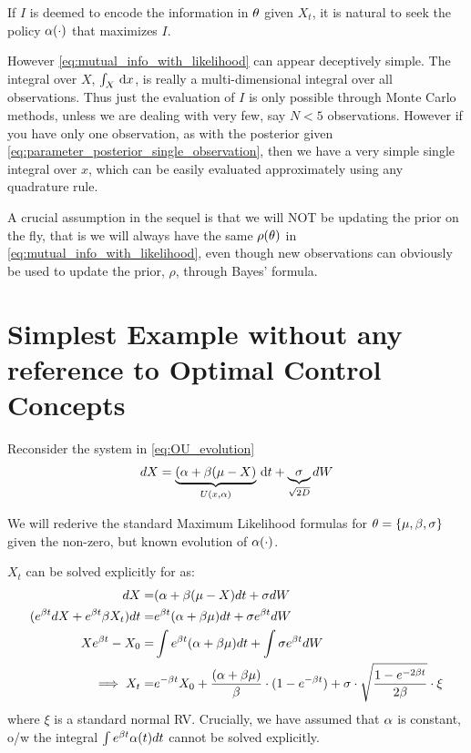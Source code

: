 \documentclass{article}
\begin{document}
If $I$ is deemed to encode the information in ${\theta}$ given $X_t$, it is
natural to seek the policy ${\alpha}(\cdot)$ that maximizes $I$.

However \cref{eq:mutual_info_with_likelihood} can appear deceptively
simple. The integral over $X$, $\int_X \, \mathrm{d} x$, is really a multi-dimensional integral
over all observations. Thus just the evaluation of $I$ is only possible through
Monte Carlo methods, unless we are dealing with very few, say $N<5$ observations.
However if you have only one observation, as with the posterior given
\cref{eq:parameter_posterior_single_observation}, then we have a very simple
single integral over $x$, which can be easily evaluated approximately using any
quadrature rule.

A crucial assumption in the sequel is that we will NOT be updating the prior on
the fly, that is we will always have the same $\rho({\theta})$ in
\cref{eq:mutual_info_with_likelihood}, even though new observations can
obviously be used to update the prior, $\rho$, through Bayes' formula.


\section{Simplest Example without any reference to Optimal Control Concepts}

Reconsider the system in \cref{eq:OU_evolution} 
$$
dX = \underbrace{({\alpha} + {\beta}( \mu - X)}_{U(x,{\alpha})} \, \mathrm{d} t +
\underbrace{{\sigma }}_{\sqrt{2D}} dW
$$

We will rederive the standard Maximum Likelihood formulas for ${\theta} = \{{\mu }, {\beta},
{\sigma }\}$ given the non-zero, but known evolution of ${\alpha}(\cdot)$.

$X_t$ can be solved explicitly for as:
\begin{align*}
dX =& ({\alpha} + {\beta}( \mu - X) dt + {\sigma } dW
\\
(e^{{\beta} t} dX + e^{{\beta} t}{\beta} X_t) dt
=&
e^{ {\beta} t}( {\alpha} + {\beta} {\mu }) dt + {\sigma } e^{{\beta} t} dW
\\
Xe^{{\beta} t} - X_0 =&
\int e^{ {\beta} t}( {\alpha} + {\beta} {\mu }) dt +  \int {\sigma } e^{{\beta} t} dW
\\
\implies
X_t =& e^{-{\beta} t} X_0 
		+ \frac{({\alpha} + {\beta} {\mu })}{{\beta}} \cdot ( 1- e^{-{\beta} t}) +
	       {\sigma }  \cdot \sqrt\frac{{ 1 - e^{-2{\beta} t}}}{2{\beta}} \cdot \xi 
\end{align*}
where $\xi$ is a standard normal RV. Crucially, we have assumed that ${\alpha}$ is
constant, o/w the integral $\int e^{ {\beta} t}  {\alpha}(t) dt$ cannot be solved
explicitly.
\end{document}
